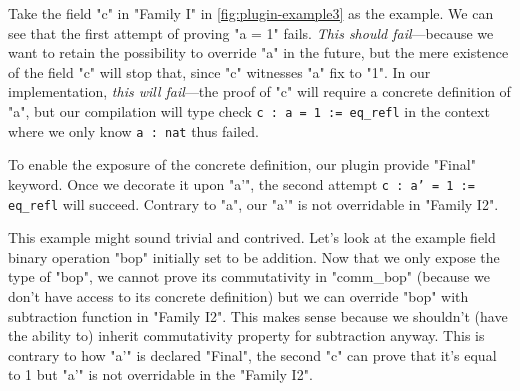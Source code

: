 Take the field "c" in "Family I" in \cref{fig:plugin-example3} as the
example. We can see that the first attempt of proving "a = 1" fails.
\textit{This should fail}---because we want to retain the possibility
to override "a" in the future, but the mere existence of the field "c"
will stop that, since "c" witnesses "a" fix to "1". In our implementation, \textit{this will fail}---the proof of "c" will require a concrete definition of "a",
but our compilation will type check \texttt{c : a = 1 := eq_refl} in the context where we only know \texttt{a : nat} thus failed.  

To enable the exposure of the concrete definition,
our plugin provide "Final" keyword. Once we decorate it upon "a'", the second attempt \texttt{c : a' = 1 := eq_refl} will succeed. Contrary to "a", our "a'" is not overridable in "Family I2".

This example might sound trivial and contrived. Let's look at the
example field binary operation "bop" initially set to be addition. Now that we only expose the type of "bop", we
cannot prove its commutativity in "comm_bop" (because we don't have
access to its concrete definition) but we can override "bop" with
subtraction function in "Family I2". This makes sense because we
shouldn't (have the ability to) inherit commutativity property for subtraction
anyway. This is contrary to how "a'" is declared "Final", the second "c"
can prove that it's equal to 1 but "a'" is not overridable in the
"Family I2".


